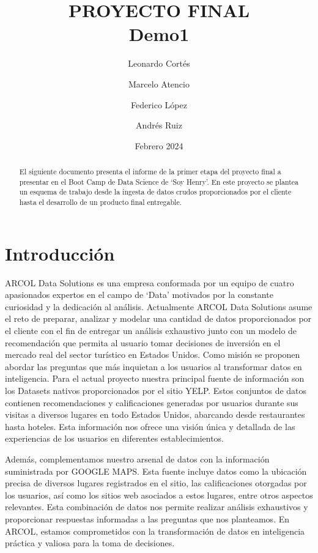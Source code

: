\documentclass[12pt]{article}
\title{PROYECTO FINAL\\
\large Demo1}
\author{Leonardo Cortés \and Marcelo Atencio \and Federico López \and Andrés Ruiz}
\date{Febrero 2024}
\begin{document}
\maketitle

\begin{abstract}
El siguiente documento presenta el informe de la primer etapa del proyecto final a presentar en el Boot Camp de Data Science de `Soy Henry'. En este proyecto se plantea un esquema de trabajo desde la ingesta de datos crudos proporcionados por el cliente hasta el desarrollo de un producto final entregable.
\end{abstract}

\tableofcontents

\section{Introducción}
ARCOL Data Solutions es una empresa conformada por un equipo de cuatro apasionados expertos en el campo de `Data' motivados por la constante curiosidad y la dedicación al análisis.  Actualmente ARCOL Data Solutions asume el reto de preparar, analizar y modelar una cantidad de datos proporcionados por el cliente con el fin de entregar un análisis exhaustivo junto con un modelo de recomendación que permita al usuario tomar decisiones de inversión en el mercado real del sector turístico en Estados Unidos.  
Como misión se proponen abordar las preguntas que más inquietan a los usuarios al transformar datos en inteligencia. 
Para el actual proyecto nuestra principal fuente de información son los Datasets nativos proporcionados por el sitio YELP. Estos conjuntos de datos contienen recomendaciones y calificaciones generadas por usuarios durante sus visitas a diversos lugares en todo Estados Unidos, abarcando desde restaurantes hasta hoteles. Esta información nos ofrece una visión única y detallada de las experiencias de los usuarios en diferentes establecimientos.

Además, complementamos nuestro arsenal de datos con la información suministrada por GOOGLE MAPS. Esta fuente incluye datos como la ubicación precisa de diversos lugares registrados en el sitio, las calificaciones otorgadas por los usuarios, así como los sitios web asociados a estos lugares, entre otros aspectos relevantes. Esta combinación de datos nos permite realizar análisis exhaustivos y proporcionar respuestas informadas a las preguntas que nos planteamos. En ARCOL, estamos comprometidos con la transformación de datos en inteligencia práctica y valiosa para la toma de decisiones.
\end{document}
